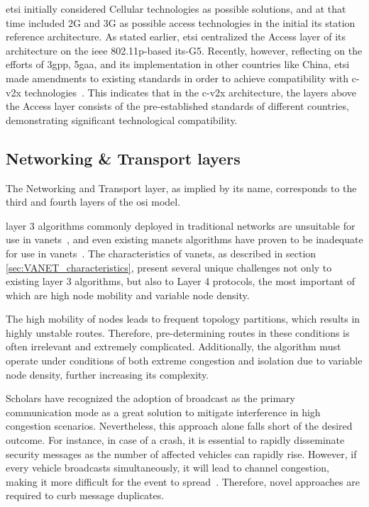 \gls{etsi} initially considered Cellular technologies as possible solutions, and at that time included 2G and 3G as possible access technologies in the initial \gls{its} station reference architecture. As stated earlier, \gls{etsi} centralized the Access layer of its architecture on the \gls{ieee} 802.11p-based \gls{its}-G5. Recently, however, reflecting on the efforts of \gls{3gpp}, \gls{5gaa}, and \gls{its} implementation in other countries like China, \gls{etsi} made amendments to existing standards in order to achieve compatibility with \gls{c-v2x} technologies~\cite{weber_c-v2x_2019}. This indicates that in the \gls{c-v2x} architecture, the layers above the Access layer consists of the pre-established standards of different countries, demonstrating significant technological compatibility.


\subsection[Networking \& Transport layers]{Networking \& Transport layers}
\label{subsec:networking_transport_layers}
The Networking and Transport layer, as implied by its name, corresponds to the third and fourth layers of the \gls{osi} model.

layer 3 algorithms commonly deployed in traditional networks are unsuitable for use in \glspl{vanet}~\cite{toor_vehicle_2008}, and even existing \glspl{manet} algorithms have proven to be inadequate for use in \glspl{vanet}~\cite{liang_vehicular_2015}. The characteristics of \glspl{vanet}, as described in section \ref{sec:VANET_characteristics}, present several unique challenges not only to existing layer 3 algorithms, but also to Layer 4 protocols, the most important of which are high node mobility and variable node density.

The high mobility of nodes leads to frequent topology partitions, which results in highly unstable routes. Therefore, pre-determining routes in these conditions is often irrelevant and extremely complicated. Additionally, the algorithm must operate under conditions of both extreme congestion and isolation due to variable node density, further increasing its complexity.

Scholars have recognized the adoption of broadcast as the primary communication mode as a great solution to mitigate interference in high congestion scenarios. Nevertheless, this approach alone falls short of the desired outcome. For instance, in case of a crash, it is essential to rapidly disseminate security messages as the number of affected vehicles can rapidly rise. However, if every vehicle broadcasts simultaneously, it will lead to channel congestion, making it more difficult for the event to spread~\cite{toor_vehicle_2008}. Therefore, novel approaches are required to curb message duplicates. 

